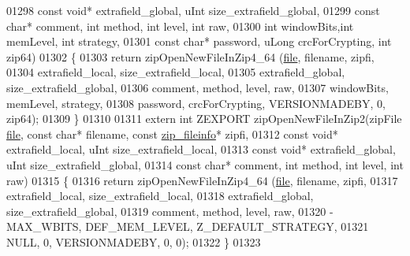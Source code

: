 \begin{DoxyCode}
01298                                          \textcolor{keyword}{const} \textcolor{keywordtype}{void}* extrafield\_global, uInt size\_extrafield\_global,
01299                                          \textcolor{keyword}{const} \textcolor{keywordtype}{char}* comment, \textcolor{keywordtype}{int} method, \textcolor{keywordtype}{int} level, \textcolor{keywordtype}{int} raw,
01300                                          \textcolor{keywordtype}{int} windowBits,\textcolor{keywordtype}{int} memLevel, \textcolor{keywordtype}{int} strategy,
01301                                          \textcolor{keyword}{const} \textcolor{keywordtype}{char}* password, uLong crcForCrypting, \textcolor{keywordtype}{int} zip64)
01302 \{
01303     \textcolor{keywordflow}{return} zipOpenNewFileInZip4\_64 (\hyperlink{structfile}{file}, filename, zipfi,
01304                                  extrafield\_local, size\_extrafield\_local,
01305                                  extrafield\_global, size\_extrafield\_global,
01306                                  comment, method, level, raw,
01307                                  windowBits, memLevel, strategy,
01308                                  password, crcForCrypting, VERSIONMADEBY, 0, zip64);
01309 \}
01310 
01311 \textcolor{keyword}{extern} \textcolor{keywordtype}{int} ZEXPORT zipOpenNewFileInZip2(zipFile \hyperlink{structfile}{file}, \textcolor{keyword}{const} \textcolor{keywordtype}{char}* filename, \textcolor{keyword}{const} 
      \hyperlink{structzip__fileinfo}{zip\_fileinfo}* zipfi,
01312                                         \textcolor{keyword}{const} \textcolor{keywordtype}{void}* extrafield\_local, uInt size\_extrafield\_local,
01313                                         \textcolor{keyword}{const} \textcolor{keywordtype}{void}* extrafield\_global, uInt size\_extrafield\_global,
01314                                         \textcolor{keyword}{const} \textcolor{keywordtype}{char}* comment, \textcolor{keywordtype}{int} method, \textcolor{keywordtype}{int} level, \textcolor{keywordtype}{int} raw)
01315 \{
01316     \textcolor{keywordflow}{return} zipOpenNewFileInZip4\_64 (\hyperlink{structfile}{file}, filename, zipfi,
01317                                  extrafield\_local, size\_extrafield\_local,
01318                                  extrafield\_global, size\_extrafield\_global,
01319                                  comment, method, level, raw,
01320                                  -MAX\_WBITS, DEF\_MEM\_LEVEL, Z\_DEFAULT\_STRATEGY,
01321                                  NULL, 0, VERSIONMADEBY, 0, 0);
01322 \}
01323 

\end{DoxyCode}
